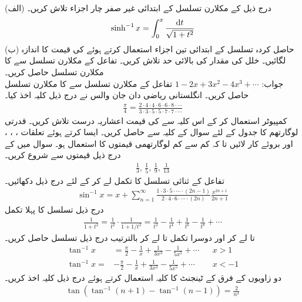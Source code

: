 (الف) درج ذیل کے مکلارن تسلسل کے ابتدائی غیر صفر چار اجزاء تلاش کریں۔
\begin{align*}
\sinh^{-1}x=\int_0^x\frac{\dif t}{\sqrt{1+t^2}}
\end{align*}
(ب) حاصل کردہ تسلسل کے ابتدائی تین اجزاء استعمال کرتے ہوئے  کی قیمت کا اندازہ لگائیں۔ خلل کی مقدار کی بالائی حد تلاش کریں۔
تفاعل  کے مکلارن تسلسل سے  کا مکلارن تسلسل حاصل کریں۔\\
جواب:\quad
$1-2x+3x^2-4x^3+\cdots$
تفاعل  کے مکلارن تسلسل سے  کا مکلارن تسلسل حاصل کریں۔
انگلستانی ریاضی دان جان والس نے درج ذیل کلیہ اخذ کیا۔
\begin{align*}
\frac{\pi}{4}=\frac{2\cdot 4\cdot 4\cdot 6\cdot 6\cdot 8\cdot\cdots}{3\cdot 3\cdot 5\cdot 5\cdot 7\cdot 7\cdot \cdots}
\end{align*} 
کمپیوٹر استعمال کر کے اس کلیہ سے  کی قیمت  اعشاریہ درست تلاش کریں۔
قدرتی لوگارتھم   کا جدول  کے لئے سوال  کے کلیہ سے حاصل کریں۔ ایسا کرتے ہوئے  تعلقات ، ، ،  اور   بروئے کار لائیں تا کہ کم سے کم لوگارتھمی قیمتوں کا استعمال ہو۔ سوال  میں  کے درج ذیل قیمتوں سے شروع کریں۔
\begin{align*}
\frac{1}{3},\,\frac{1}{5},\,\frac{1}{9},\,\frac{1}{13}
\end{align*} 
تفاعل  کے ثنائی تسلسل کا تکمل لے کر  کے لئے درج ذیل دکھائیں۔
\begin{align*}
\sin^{-1}x=x+\sum_{n=1}^{\infty}\frac{1\cdot3\cdot 5\cdot\cdots\cdot (2n-1)}{2\cdot4\cdot6\cdot\cdots\cdot(2n)}\frac{x^{2n+1}}{2n+1}
\end{align*}
درج ذیل تسلسل کا پہلا تکمل  
\begin{align*}
\frac{1}{1+t^2}=\frac{1}{t^2}\cdot\frac{1}{1+1/t^2}=\frac{1}{t^2}-\frac{1}{t^4}+\frac{1}{t^6}-\frac{1}{t^8}+\cdots
\end{align*}
 تا  لے کر اور دوسرا تکمل  تا  لے کر بالترتیب درج ذیل تسلسل حاصل کریں۔
\begin{align*}
\tan^{-1}x&=\frac{\pi}{2}-\frac{1}{x}+\frac{1}{3x^3}-\frac{1}{5x^5}+\cdots&&x>1\\
\tan^{-1}x=&-\frac{\pi}{2}-\frac{1}{x}+\frac{1}{3x^3}-\frac{1}{5x^5}+\cdots&&x<-1
\end{align*}
دو زاویوں کے فرق کے ٹینجنٹ کا کلیہ استعمال کرتے ہوئے درج ذیل کلیہ اخذ کریں۔
\begin{align*}
\tan(\tan^{-1}(n+1)-\tan^{-1}(n-1))=\frac{2}{n^2}
\end{align*}

